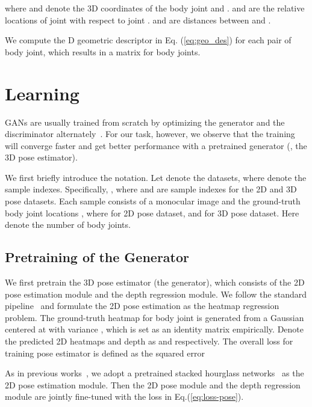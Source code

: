 \documentclass[10pt,twocolumn,letterpaper]{article}
\begin{document}
where  and  denote the 3D coordinates of the body joint  and . 
 and  are the relative locations of joint  with respect to joint . 
 and  are distances between  and . 

We compute the D geometric descriptor  in Eq. (\ref{eq:geo_des}) for each pair of body joint, which results in a  matrix  for  body joints. 




\section{Learning}
GANs are usually trained from scratch by optimizing the generator and the discriminator alternately~\cite{goodfellow2014generative,radford2015unsupervised}. 
For our task, however, we observe that the training will converge faster and get better performance with a pretrained generator (\ie, the 3D pose estimator). 


We first briefly introduce the notation. 
Let  denote the datasets, 
where  denote the sample indexes. 
Specifically,  , where  and  are sample indexes for the 2D and 3D pose datasets. 
Each sample   consists of a monocular image  and the ground-truth body joint locations , 
where  for 2D pose dataset, and  for 3D pose dataset. 
Here  denote the number of body joints. 

\subsection{Pretraining of the Generator} 

We first pretrain the 3D pose estimator (\ie the generator), which consists of the 2D pose estimation module and the depth regression module. 
We follow the standard pipeline~\cite{tompson2015efficient,wei2016convolutional,cao2016realtime,newell2016stacked} and formulate the 2D pose estimation as the heatmap regression problem. 
The ground-truth heatmap  for body joint  is generated from a Gaussian centered at  with variance , which is set as an identity matrix empirically. 
Denote the predicted 2D heatmaps and depth as  and  respectively. 
The overall loss for training pose estimator is defined as the squared error
{\small

}

As in previous works~\cite{martinez2017simple,zhou2017towards}, we adopt a pretrained stacked hourglass networks~\cite{newell2016stacked} as the 2D pose estimation module. 
Then the 2D pose module and the depth regression module are jointly fine-tuned with the loss in Eq.(\ref{eq:loss-pose}).  
\end{document}
